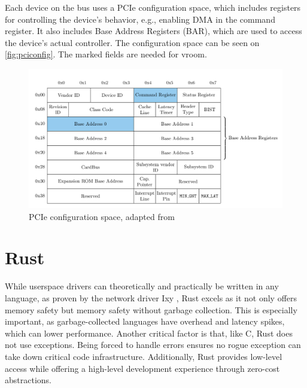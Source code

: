 Each device on the bus uses a PCIe configuration space, which includes registers for controlling the device's behavior, e.g., enabling DMA in the command register. It also includes Base Address Registers (BAR), which are used to access the device's actual controller. The configuration space can be seen on \autoref{fig:pciconfig}. The marked fields are needed for vroom.

\begin{figure}[H]
    \centering
    \includegraphics[width=\textwidth]{figures/pcie-config-space}
    \caption{PCIe configuration space, adapted from \cite{vroom}}
    \label{fig:pciconfig}
\end{figure}

\section{Rust}
While userspace drivers can theoretically and practically be written in any language, as proven by the network driver Ixy \cite{ixylanggithub}, Rust excels as it not only offers memory safety but memory safety without garbage collection. This is especially important, as garbage-collected languages have overhead and latency spikes, which can lower performance. Another critical factor is that, like C, Rust does not use exceptions. Being forced to handle errors ensures no rogue exception can take down critical code infrastructure.
Additionally, Rust provides low-level access while offering a high-level development experience through zero-cost abstractions.